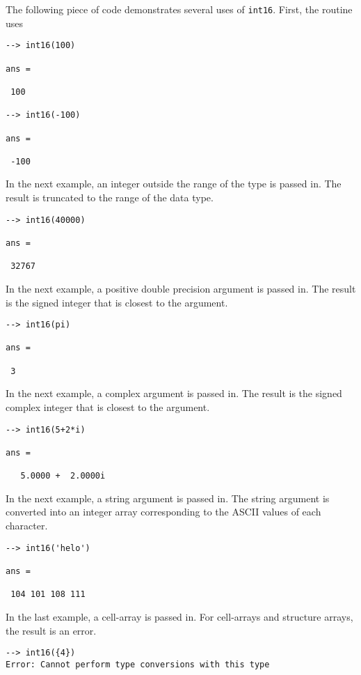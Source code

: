 The following piece of code demonstrates several uses of \verb|int16|.  First, the routine uses
\begin{verbatim}
--> int16(100)

ans = 

 100 

--> int16(-100)

ans = 

 -100 
\end{verbatim}
In the next example, an integer outside the range  of the type is passed in.  
The result is truncated to the range of the data type.
\begin{verbatim}
--> int16(40000)

ans = 

 32767 
\end{verbatim}
In the next example, a positive double precision argument is passed in.  
The result is the signed integer that is closest to the argument.
\begin{verbatim}
--> int16(pi)

ans = 

 3 
\end{verbatim}
In the next example, a complex argument is passed in.  The result is the 
signed complex integer that is closest to the argument.
\begin{verbatim}
--> int16(5+2*i)

ans = 

   5.0000 +  2.0000i 
\end{verbatim}
In the next example, a string argument is passed in.  The string argument is 
converted into an integer array corresponding to the ASCII values of each character.
\begin{verbatim}
--> int16('helo')

ans = 

 104 101 108 111 
\end{verbatim}
In the last example, a cell-array is passed in.  For cell-arrays and 
structure arrays, the result is an error.
\begin{verbatim}
--> int16({4})
Error: Cannot perform type conversions with this type
\end{verbatim}
